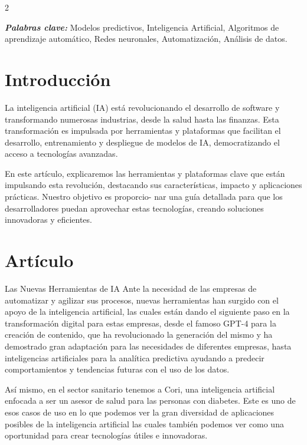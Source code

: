 \documentclass[12pt,spanish,Letterpaper,openany]{book}
\begin{document}
\begin {multicols}{2}

\textbf{\emph{Palabras clave:}} Modelos predictivos, Inteligencia Artificial, Algoritmos de aprendizaje automático, Redes neuronales, Automatización, Análisis de datos.

\hypertarget{introducciuxf3n-2}{%
\section{Introducción}\label{introducciuxf3n-2}}

La inteligencia artificial (IA) está revolucionando el desarrollo de software y transformando numerosas industrias, desde la salud hasta las finanzas. Esta transformación es impulsada por herramientas y plataformas que facilitan el desarrollo, entrenamiento y despliegue de modelos de IA, democratizando el acceso a tecnologías avanzadas.

En este artículo, explicaremos las herramientas y plataformas clave que están impulsando esta revolución, destacando sus características, impacto y aplicaciones prácticas. Nuestro objetivo es proporcio-
nar una guía detallada para que los desarrolladores puedan aprovechar estas tecnologías, creando soluciones innovadoras y eficientes.

\hypertarget{artuxedculo-2}{%
\section{Artículo}\label{artuxedculo-2}}

Las Nuevas Herramientas de IA
Ante la necesidad de las empresas de automatizar y agilizar sus procesos, nuevas herramientas han surgido con el apoyo de la inteligencia artificial, las cuales están dando el siguiente paso en la transformación digital para estas empresas, desde el famoso GPT-4 para la creación de contenido, que ha revolucionado la generación del mismo y ha demostrado gran adaptación para las necesidades de diferentes empresas, hasta inteligencias artificiales para la analítica predictiva ayudando a predecir comportamientos y tendencias futuras con el uso de los datos.

Así mismo, en el sector sanitario tenemos a Cori, una inteligencia artificial enfocada a ser un asesor de salud para las personas con diabetes. Este es uno de esos casos de uso en lo que podemos ver la gran diversidad de aplicaciones posibles de la inteligencia artificial las cuales también podemos ver como una oportunidad para crear tecnologías útiles e innovadoras.


\end{multicols}
\end{document}
